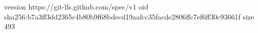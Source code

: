 version https://git-lfs.github.com/spec/v1
oid sha256:b7a3ff3dd2365c4b80b9f68bdecd19aafcc35facde2806ffc7ef6ff30c93661f
size 493
